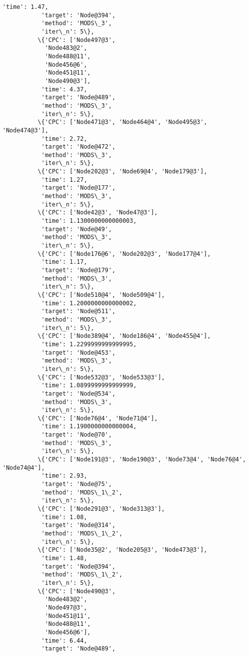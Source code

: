 \documentclass[11pt]{article}
\begin{document}
\begin{Verbatim}[commandchars=\\\{\}]
           'time': 1.47,
           'target': 'Node@394',
           'method': 'MODS\_3',
           'iter\_n': 5\},
          \{'CPC': ['Node497@3',
            'Node483@2',
            'Node488@11',
            'Node456@6',
            'Node451@11',
            'Node490@3'],
           'time': 4.37,
           'target': 'Node@489',
           'method': 'MODS\_3',
           'iter\_n': 5\},
          \{'CPC': ['Node471@3', 'Node464@4', 'Node495@3', 'Node474@3'],
           'time': 2.72,
           'target': 'Node@472',
           'method': 'MODS\_3',
           'iter\_n': 5\},
          \{'CPC': ['Node202@3', 'Node69@4', 'Node179@3'],
           'time': 1.27,
           'target': 'Node@177',
           'method': 'MODS\_3',
           'iter\_n': 5\},
          \{'CPC': ['Node42@3', 'Node47@3'],
           'time': 1.1300000000000003,
           'target': 'Node@49',
           'method': 'MODS\_3',
           'iter\_n': 5\},
          \{'CPC': ['Node176@6', 'Node202@3', 'Node177@4'],
           'time': 1.17,
           'target': 'Node@179',
           'method': 'MODS\_3',
           'iter\_n': 5\},
          \{'CPC': ['Node510@4', 'Node509@4'],
           'time': 1.2000000000000002,
           'target': 'Node@511',
           'method': 'MODS\_3',
           'iter\_n': 5\},
          \{'CPC': ['Node389@4', 'Node186@4', 'Node455@4'],
           'time': 1.2299999999999995,
           'target': 'Node@453',
           'method': 'MODS\_3',
           'iter\_n': 5\},
          \{'CPC': ['Node532@3', 'Node533@3'],
           'time': 1.0899999999999999,
           'target': 'Node@534',
           'method': 'MODS\_3',
           'iter\_n': 5\},
          \{'CPC': ['Node76@4', 'Node71@4'],
           'time': 1.1900000000000004,
           'target': 'Node@70',
           'method': 'MODS\_3',
           'iter\_n': 5\},
          \{'CPC': ['Node191@3', 'Node190@3', 'Node73@4', 'Node76@4', 'Node74@4'],
           'time': 2.93,
           'target': 'Node@75',
           'method': 'MODS\_1\_2',
           'iter\_n': 5\},
          \{'CPC': ['Node291@3', 'Node313@3'],
           'time': 1.08,
           'target': 'Node@314',
           'method': 'MODS\_1\_2',
           'iter\_n': 5\},
          \{'CPC': ['Node35@2', 'Node205@3', 'Node473@3'],
           'time': 1.48,
           'target': 'Node@394',
           'method': 'MODS\_1\_2',
           'iter\_n': 5\},
          \{'CPC': ['Node490@3',
            'Node483@2',
            'Node497@3',
            'Node451@11',
            'Node488@11',
            'Node456@6'],
           'time': 6.44,
           'target': 'Node@489',

\end{Verbatim}
\end{document}
